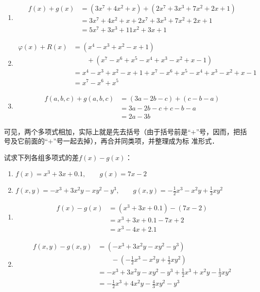 \begin{solution}
\begin{enumerate}
    \item \[\begin{split}
        f(x)+g(x)&=(3x^7+4x^2+x)+(2x^7+3x^3+7x^2+2x+1)\\
        &=3x^7+4x^2+x+2x^7+3x^3+7x^2+2x+1\\
&=5x^7+3x^3+11x^2+3x+1
    \end{split}\]
    \item \[\begin{split}
        \varphi(x)+R(x)&=(x^4-x^3+x^2-x+1)\\
        &\qquad +(x^7-x^6+x^5-x^4+x^3-x^2+x-1)\\
        &=x^4-x^3+x^2-x+1+x^7-x^6+x^5-x^4+x^3-x^2+x-1\\
        &=x^7-x^6+x^5
    \end{split}\]
    \item \[\begin{split}
        f(a,b,c)+g(a,b,c)&=(3a-2b-c)+(c-b-a)\\
        &=3a-2b-c+c-b-a\\
&=2a-3b        
    \end{split}\]
\end{enumerate}    
\end{solution}

可见，两个多项式相加，实际上就是先去括号（由于括号前是“$+$”号，因而，把括号及它前面的“$+$”号一起去掉），再合并同类项，并整理成为标
准形式．


\begin{example}
    试求下列各组多项式的差$f(x)-g(x)$：
    \begin{enumerate}
        \item $f(x)=x^3+3x+0.1,\qquad g(x)=7x-2$
        \item $f(x,y)=-x^3+3x^2y-xy^2-y^3,\qquad g(x,y)=-\frac{1}{2}x^3-x^2y+\frac{1}{3}xy^2$
    \end{enumerate}
\end{example}

\begin{solution}
    \begin{enumerate}
        \item \[\begin{split}
            f(x)-g(x)&=  (x^3+3x+0.1)-(7x-2)\\
            &=x^3+3x+0.1-7x+2\\
            &=x^3-4x+2.1
        \end{split}\]
        \item \[\begin{split}
            f(x,y)-g(x,y)&=(-x^3+3x^2y-xy^2-y^3) \\
            &\qquad -\left(-\frac{1}{2}x^3-x^2y+\frac{1}{3}xy^2\right)\\
            &=-x^3+3x^2y-xy^2-y^3+\frac{1}{2}x^3+x^2y-\frac{1}{3}xy^2\\
            &=-\frac{1}{2}x^3+4x^2y-\frac{4}{3}xy^2-y^3
        \end{split}\]
    \end{enumerate}
\end{solution}

